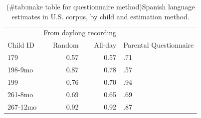 \documentclass[
]{article}
\begin{document}
\begin{table}[!h]

\caption{(\#tab:make table for questionnaire method)Spanish language estimates in U.S. corpus, by child and estimation method.}
\centering
\begin{tabular}[t]{lrrl}
\toprule
\multicolumn{1}{c}{ } & \multicolumn{2}{c}{From daylong recording} & \multicolumn{1}{c}{ } \\
\cmidrule(l{3pt}r{3pt}){2-3}
Child ID & Random & All-day & Parental Questionnaire\\
\midrule
179 & 0.57 & 0.57 & .71\\
198-9mo & 0.87 & 0.78 & .57\\
199 & 0.76 & 0.70 & .94\\
261-8mo & 0.69 & 0.65 & .69\\
267-12mo & 0.92 & 0.92 & .87\\
\bottomrule
\end{tabular}
\end{table}
\end{document}
